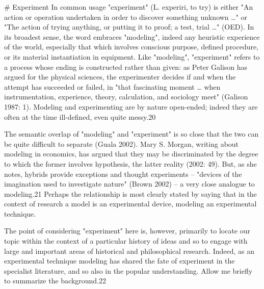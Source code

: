 # Experiment
In common usage "experiment" (L. experiri, to try) is either "An action or operation undertaken in order to discover something unknown …" or "The action of trying anything, or putting it to proof; a test, trial …" (OED). In its broadest sense, the word embraces "modeling", indeed any heuristic experience of the world, especially that which involves conscious purpose, defined procedure, or its material instantiation in equipment. Like "modeling", "experiment" refers to a process whose ending is constructed rather than given: as Peter Galison has argued for the physical sciences, the experimenter decides if and when the attempt has succeeded or failed, in "that fascinating moment … when instrumentation, experience, theory, calculation, and sociology meet" (Galison 1987: 1). Modeling and experimenting are by nature open-ended; indeed they are often at the time ill-defined, even quite messy.20

The semantic overlap of "modeling" and "experiment" is so close that the two can be quite difficult to separate (Guala 2002). Mary S. Morgan, writing about modeling in economics, has argued that they may be discriminated by the degree to which the former involves hypothesis, the latter reality (2002: 49). But, as she notes, hybrids provide exceptions and thought experiments – "devices of the imagination used to investigate nature" (Brown 2002) – a very close analogue to modeling.21 Perhaps the relationship is most clearly stated by saying that in the context of research a model is an experimental device, modeling an experimental technique.

The point of considering "experiment" here is, however, primarily to locate our topic within the context of a particular history of ideas and so to engage with large and important areas of historical and philosophical research. Indeed, as an experimental technique modeling has shared the fate of experiment in the specialist literature, and so also in the popular understanding. Allow me briefly to summarize the background.22


